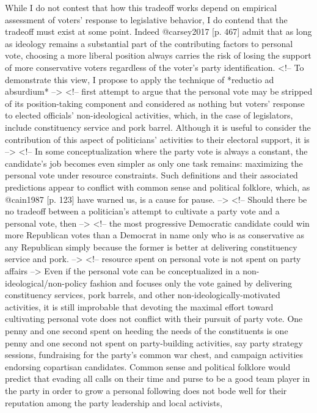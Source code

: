 \documentclass[hyphens, crop=false]{standalone}
\begin{document}
		While I do not contest that how this tradeoff works depend on empirical assessment of voters' response to legislative behavior,
		 I do contend that the tradeoff must exist at some point.
		 Indeed @carsey2017 [p.
		 467] admit that as long as ideology remains a substantial part of the contributing factors to personal vote,
		 choosing a more liberal position always carries the risk of losing the support of more conservative voters regardless of the voter's party identification.
		<!-- To demonstrate this view,
		 I propose to apply the technique of *reductio ad absurdium* --> <!-- first attempt to argue that the personal vote may be stripped of its position-taking component and considered as nothing but voters' response to elected officials' non-ideological activities,
		 which,
		 in the case of legislators,
		 include constituency service and pork barrel.
		 Although it is useful to consider the contribution of this aspect of politicians' activities to their electoral support,
		 it is --> <!-- In some conceptualization where the party vote is always a constant,
		 the candidate's job becomes even simpler as only one task remains: maximizing the personal vote under resource constraints.
		 Such definitions and their associated predictions appear to conflict with common sense and political folklore,
		 which,
		 as @cain1987 [p.
		 123] have warned us,
		 is a cause for pause.
		  --> <!-- Should there be no tradeoff between a politician's attempt to cultivate a party vote and a personal vote,
		 then  --> <!-- the most progressive Democratic candidate could win more Republican votes than a Democrat in name only who is as conservative as any Republican simply because the former is better at delivering constituency service and pork.
		 --> <!-- resource spent on personal vote is not spent on party affairs --> Even if the personal vote can be conceptualized in a non-ideological/non-policy fashion and focuses only the vote gained by delivering constituency services,
		 pork barrels,
		 and other non-ideologically-motivated activities,
		 it is still improbable that devoting the maximal effort toward cultivating personal vote does not conflict with their pursuit of party vote.
		 One penny and one second spent on heeding the needs of the constituents is one penny and one second not spent on party-building activities,
		 say party strategy sessions,
		 fundraising for the party's common war chest,
		 and campaign activities endorsing copartisan candidates.
		 Common sense and political folklore would predict that evading all calls on their time and purse to be a good team player in the party in order to grow a personal following does not bode well for their reputation among the party leadership and local activists,
\end{document}
